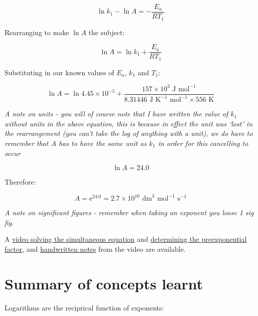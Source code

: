 \documentclass[
]{book}
\begin{document}
\begin{equation*}
\ln {k_1} - \ln {A}= -\frac{E_a}{RT_1} 
\end{equation*}

Rearranging to make \(\ln A\) the subject:

\begin{equation*}
\ln {A}= \ln {k_1} + \frac{E_a}{RT_1} 
\end{equation*}

Substituting in our known values of \(E_a\), \(k_1\) and \(T_1\):

\begin{equation*}
\ln {A}= \ln {4.45 \times 10^{-5}} + \frac{157 \times 10^3\textrm{ J mol}^{-1}}{8.31446 \textrm{ J K}^{-1} \textrm{ mol}^{-1} \times 556 \textrm{ K}} 
\end{equation*}

\emph{A note on units - you will of course note that I have written the value of \(k_1\) without units in the above equation, this is because in effect the unit was `lost' in the rearrangement (you can't take the log of anything with a unit), we do have to remember that \(A\) has to have the same unit as \(k_1\) in order for this cancelling to occur}

\begin{equation*}
\ln {A}= 24.0
\end{equation*}

Therefore:

\begin{equation*}
A= \textrm{e}^{24.0} = 2.7 \times 10^{10} \textrm{ dm}^3 \textrm{ mol}^{-1} \textrm{ s}^{-1}
\end{equation*}

\emph{A note on significant figures - remember when taking an exponent you loose 1 sig fig}.

A \href{https://youtu.be/hrwBXtnWVAA}{video solving the simultaneous equation} and \href{https://youtu.be/608WX_mLfBI}{determining the preexponential factor}, and \href{http://workitoutwithapencil.xyz/wp-content/uploads/2021/07/Solving-problems-using-simultaneous-equations-2.pdf}{handwritten notes} from the video are available.

\hypertarget{sec:summary2}{%
\section{Summary of concepts learnt}\label{sec:summary2}}

Logarithms are the reciprical function of exponents:
\end{document}
